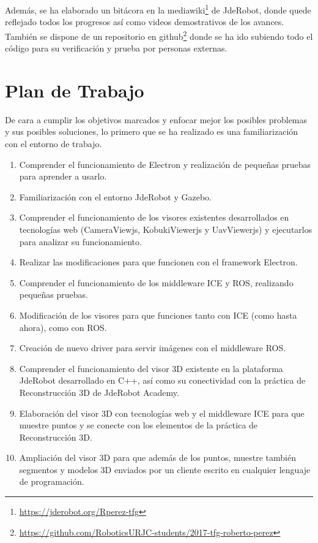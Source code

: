 Además, se ha elaborado un bitácora en la mediawiki\footnote{\url{https://jderobot.org/Rperez-tfg}} de JdeRobot, donde quede reflejado todos los progresos así como videos demostrativos de los avances. También se dispone de un repositorio en github\footnote{\url{https://github.com/RoboticsURJC-students/2017-tfg-roberto-perez}} donde se ha ido subiendo todo el código para su verificación y prueba por personas externas.

\section{Plan de Trabajo}
De cara a cumplir los objetivos marcados y enfocar mejor los posibles problemas y sus posibles soluciones, lo primero que se ha realizado es una familiarización con el entorno de trabajo.

\begin{enumerate}
\item Comprender el funcionamiento de Electron y realización de pequeñas pruebas para aprender a usarlo.
\item Familiarización con el entorno JdeRobot y Gazebo.
\item Comprender el funcionamiento de los visores existentes desarrollados en tecnologías web (CameraViewjs, KobukiViewerjs y UavViewerjs) y ejecutarlos para analizar su funcionamiento.
\item Realizar las modificaciones para que funcionen con el framework Electron.
\item Comprender el funcionamiento de los middleware ICE y ROS, realizando pequeñas pruebas.
\item Modificación de los visores para que funciones tanto con ICE (como hasta ahora), como con ROS.
\item Creación de nuevo driver para servir imágenes con el middleware ROS.
\item Comprender el funcionamiento del visor 3D existente en la plataforma JdeRobot desarrollado en C++, así como su conectividad con la práctica de Reconstrucción 3D de JdeRobot Academy.
\item Elaboración del visor 3D con tecnologías web y el middleware ICE para que muestre puntos y se conecte con los elementos de la práctica de Reconstrucción 3D.
\item Ampliación del visor 3D para que además de los puntos, muestre también segmentos y modelos 3D enviados por un cliente escrito en cualquier lenguaje de programación.
\end{enumerate}


